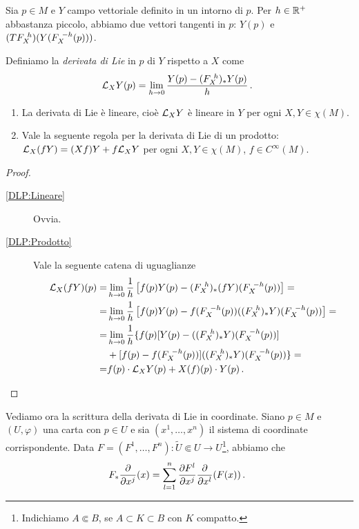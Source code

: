 Sia $p\in M$ e $Y$ campo vettoriale definito in un intorno di $p$. Per $h\in\mathbb R^+$ abbastanza piccolo, abbiamo due vettori tangenti in $p$: $Y(p)$ e $(TF_{X}^{\ h})(Y(F_{X}^{\ -h}(p)))$.

\begin{definition} 
	Definiamo la \emph{derivata di Lie} in $p$ di $Y$ rispetto a $X$ come \begin{equation*}\mathcal L_XY(p)=\lim_{h\to 0}\frac{Y(p)-(F_{X}^{\ h})_*Y(p)}h \, \text{. }
	\end{equation*}
\end{definition}

\begin{proposition} \label{prop:DerLieProprieta}
	\begin{enumerate}
		\item La derivata di Lie è lineare, cioè $\mathcal L_XY$ è lineare in $Y$ per ogni $X,Y\in\chi(M)$. \label{DLP:Lineare}
		\item Vale la seguente regola per la derivata di Lie di un prodotto: $\mathcal L_X(fY)=(Xf)Y+f\mathcal L_XY$ per ogni $X,Y\in\chi(M)$, $f\in C^\infty(M)$. \label{DLP:Prodotto}
	\end{enumerate}
\end{proposition}

\begin{proof}
	\begin{description}
	 \item [\ref{DLP:Lineare}] Ovvia.
	 \item [\ref{DLP:Prodotto}] Vale la seguente catena di uguaglianze
	 \begin{equation*} %
	 \begin{split}
	 \Lie_X(fY)(p)= & \lim_{h\to 0} \frac 1h \left[f(p)Y(p)-(\Fl{X}{h})_*(fY)(\Fl{X}{-h}(p))\right]=\\
	 = & \lim_{h\to 0}\frac 1h \left[f(p)Y(p)-f(\Fl{X}{-h}(p)) ((\Fl{X}{h})_*Y)(\Fl{X}{-h}(p))\right]=\\
	 = & \lim_{h\to 0}\frac 1h \{f(p)[Y(p)-((\Fl{X}{h})_*Y)(\Fl{X}{-h}(p))]\\ &+[f(p)-f(\Fl{X}{-h}(p))]((\Fl{X}{h})_*Y)(\Fl{X}{-h}(p))\}=\\
	 = & f(p)\cdot\Lie_XY(p)+X(f)(p)\cdot Y(p) \punto
	 \end{split}
	 \end{equation*}
	 \end{description}
\end{proof}

Vediamo ora la scrittura della derivata di Lie in coordinate. Siano $p\in M$ e $(U,\varphi)$ una carta con $p\in U$ e sia $(x^1,\ldots,x^n)$ il sistema di coordinate corrispondente.
Data $F=(F^1,\ldots,F^n):\tilde U \Subset U \to U$\footnote{Indichiamo $A\Subset B$, se $A\subset K \subset B$ con $K$ compatto.}, abbiamo che \begin{equation*}
	F_*\frac\partial{\partial x^j}(x)=\sum_{l=1}^n \frac{\partial F^l}{\partial x^j}\frac\partial{\partial x^l}(F(x))\, \text{. }
\end{equation*}

